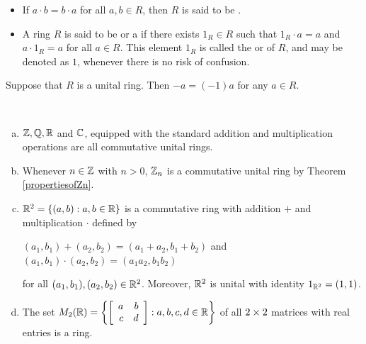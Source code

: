 \documentclass[11pt,fleqn,dvipsnames,usenames]{article}
\begin{document}
%
\terminology
\begin{itemize}
\item If $a\cdot b = b\cdot a$ for all $a,b\in R$, then $R$ is said to be .
\item A ring $R$ is said to be  or a  if there exists $1_{R}\in R$ such that $1_{R}\cdot a = a$ and $a\cdot 1_{R} = a$ for all $a\in R$.  This element $1_{R}$ is called the  or  of $R$, and may be denoted as $1$, whenever there is no risk of confusion.
\end{itemize}
%
\begin{exercise}
Suppose that $R$ is a unital ring.  Then $-a = (-1)a$ for any $a\in R$.
\end{exercise}
%
\begin{examples}\label{ringexamples}~
\begin{enumerate}[(a)]
\item $\Z, \RATIONAL, \REAL$ and $\COMPLEX$, equipped with the standard addition and multiplication operations are all commutative unital rings.
\item Whenever $n\in\Z$ with $n > 0$, $\ZN$ is a commutative unital ring by Theorem \ref{propertiesofZn}.
\item\label{Rsquared} $\REAL^{2} = \SET{(a,b):a,b\in\REAL}$ is a commutative ring with addition $+$ and multiplication $\cdot$ defined by
\begin{center}
$(a_1,b_1) + (a_2,b_2) = (a_1 + a_2,b_1 + b_2)$ and $(a_1,b_1) \cdot (a_2,b_2) = (a_1a_2,b_1b_2)$
\end{center}
for all $(a_1,b_1), (a_2,b_2)\in\REAL^{2}$.  Moreover, $\REAL^{2}$ is unital with identity $1_{\REAL^{2}} = (1,1)$.
\item The set $M_{2}(\REAL) = \SET{\MATRIX{rr}{a & b\\c&d}:a,b,c,d\in\REAL}$ of all $2\BY 2$ matrices with real entries is a ring.


\end{enumerate}
\end{examples}
\end{document}
